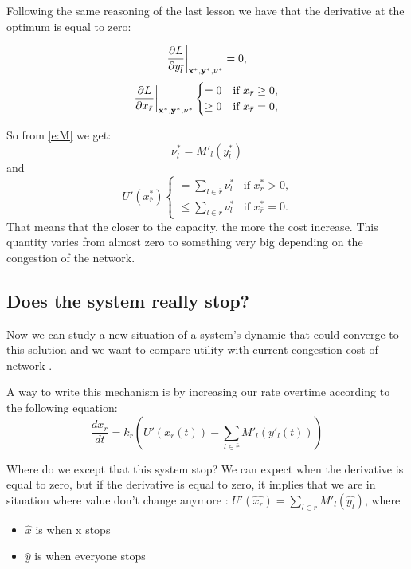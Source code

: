 Following the same reasoning of the last lesson we have that the derivative at the optimum is equal to zero:

$$ \frac{\partial L}{\partial y_{\bar l}}\bigg|_{\mathbf{x}^*,\mathbf{y}^*,\nu^*} = 0,$$
\begin{equation}
\begin{aligned}
\frac{\partial L}{\partial x_{\bar r}}\bigg|_{\mathbf{x}^*,\mathbf{y}^*,\nu^*}
\begin{cases}
= 0 & \mbox{if } x_{\bar r} \geq 0,\\
\geq0 & \mbox{if } x_{\bar r} = 0,
\end{cases}
\end{aligned}
\end{equation}

So from \eqref{e:M} we get:
$$\nu^*_{\bar l}=M'_l(y^*_{\bar l})$$
and
\begin{equation}
\ U'(x^*_{\bar r})
\begin{cases}
= \sum_{l \in {\bar r}} \nu^*_l  & \mbox{if } x^*_{\bar r} > 0,\\ 
\leq \sum_{l \in {\bar r}} \nu^*_l & \mbox{if }x^*_{\bar r} = 0.
\end{cases}
\end{equation}
That means that the closer to the capacity, the more the cost increase. This quantity varies from almost zero to something very big depending on the congestion of the network.

\subsection{Does the system really stop?}
Now we can study a new situation of a system's dynamic that could converge to this solution and we want to compare utility with current congestion cost of network .

A way to write this mechanism is by increasing our rate overtime according to the following equation:
\begin{equation}
\frac{dx_r}{ dt}=k_r(U'(x_r(t)) - \sum_{l \in {\bar r}} M'_l(y'_l(t) )   )
\end{equation}

Where do we except that this system stop?
We can expect when the derivative is equal to zero, but if the derivative is equal to zero, it implies that we are in situation where value don’t change anymore : $U'(\widehat{x_r})= \sum_{l \in r} M'_l(\widehat{y_l})$,  where 
\begin{itemize}
	\item $\widehat{x}$ is when x stops
	\item $\widehat{y}$ is when everyone stops
\end{itemize}

